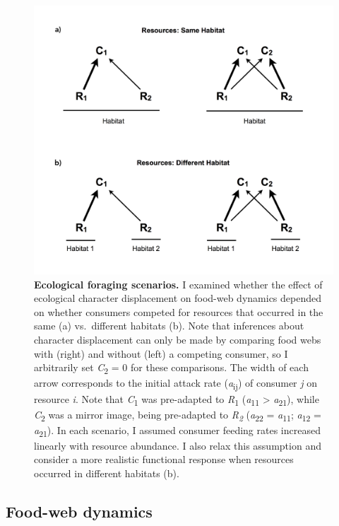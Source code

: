 \documentclass[11pt,]{article}
\begin{document}
\begin{figure}
\centering
\includegraphics{Fig_1_ForagingScenarios}
\caption{\label{fig:foraging_scenarios}\textbf{Ecological foraging
scenarios.} I examined whether the effect of ecological character
displacement on food-web dynamics depended on whether consumers competed
for resources that occurred in the same (a) vs.~different habitats (b).
Note that inferences about character displacement can only be made by
comparing food webs with (right) and without (left) a competing
consumer, so I arbitrarily set \emph{C}\textsubscript{2} = 0 for these
comparisons. The width of each arrow corresponds to the initial attack
rate (\emph{a}\textsubscript{ij}) of consumer \emph{j} on resource
\emph{i}. Note that \emph{C}\textsubscript{1} was pre-adapted to
\emph{R}\textsubscript{1} (\emph{a}\textsubscript{11} \textgreater{}
\emph{a}\textsubscript{21}), while \emph{C}\textsubscript{2} was a
mirror image, being pre-adapted to \emph{R\textsubscript{2}}
(\emph{a}\textsubscript{22} = \emph{a}\textsubscript{11};
\emph{a}\textsubscript{12} = \emph{a}\textsubscript{21}). In each
scenario, I assumed consumer feeding rates increased linearly with
resource abundance. I also relax this assumption and consider a more
realistic functional response when resources occurred in different
habitats (b).}
\end{figure}

\subsection{Food-web dynamics}\label{food-web-dynamics}
\end{document}
